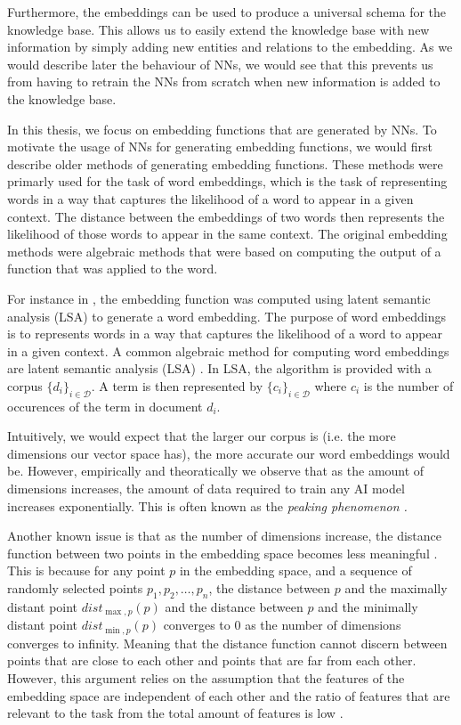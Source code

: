 Furthermore, the embeddings can be used to produce a universal schema for the knowledge base. 
This allows us to easily extend the knowledge base with new information by simply adding new entities and relations to the embedding. As we would describe later
the behaviour of NNs, we would see that this prevents us from having to retrain the NNs from scratch when new information is added to the knowledge base.

In this thesis, we focus on embedding functions that are generated by NNs. To motivate
the usage of NNs for generating embedding functions, we would first describe older methods of generating embedding functions.
These methods were primarly used for the task of word embeddings, which is the task of representing words in a way that captures the 
likelihood of a word to appear in a given context. The distance between the embeddings of two words then represents the likelihood
of those words to appear in the same context.
The original embedding methods were algebraic methods that were based on computing the output of a function that was applied to the word.

For instance in \cite{LatentSemanticAnalysis}, the embedding function was computed using latent semantic analysis (LSA) to generate a word embedding.
The purpose of word embeddings is to represents words in a way that captures the likelihood of a word to appear in a given context.
A common algebraic method for computing word embeddings are latent semantic analysis (LSA) \cite{LatentSemanticAnalysis}.
In LSA, the algorithm is provided with a corpus $\{d_i\}_{i\in\mathcal{D}}$.
A term is then represented by $\{c_i\}_{i\in\mathcal{D}}$ where
$c_i$ is the number of occurences of the term in document $d_i$.

Intuitively, we would expect that the larger our corpus is (i.e. the more dimensions our vector space has),
the more accurate our word embeddings would be.
However, empirically and theoratically we observe that as the amount of dimensions
increases, the amount of data required to train any AI model increases exponentially.
This is often known as the \it{peaking phenomenon} \cite{ThePeakingPhenomenon}.

Another known issue is that as the number of dimensions increase,
the distance function between two points in the embedding space becomes 
less meaningful \cite{WhenIsNearestNeighborMeaningful}.
This is because for any point $p$ in the embedding space, 
and a sequence of randomly selected points $p_1,p_2,\dots,p_n$,
the distance between $p$ and the maximally distant point $dist_{\max,p}(p)$
and the distance between $p$ and the minimally distant point $dist_{\min,p}(p)$
converges to $0$ as the number of dimensions converges to infinity.
Meaning that the distance function cannot discern between points that are close to each other and points that are far from each other.
However, this argument relies on the assumption that
the features of the embedding space are independent of each other
and the ratio of features that are relevant to the task
from the total amount of features is low
\cite{SurveryDistanceIndiscernabilityResults}.

